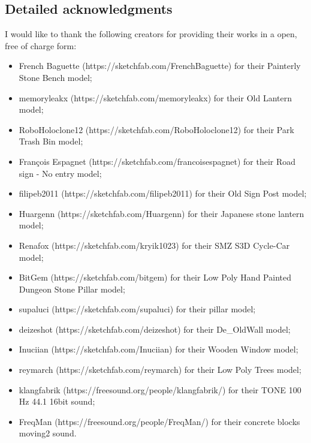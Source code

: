 \begin{appendices}

\chapter{Detailed acknowledgments}
\label{app:ack}
I would like to thank the following creators for providing their works in a open, free of charge form:
\begin{itemize}
	\item French Baguette (https://sketchfab.com/FrenchBaguette) for their Painterly Stone Bench model;
	\item memoryleakx (https://sketchfab.com/memoryleakx) for their Old Lantern model;
	\item RoboHoloclone12 (https://sketchfab.com/RoboHoloclone12) for their Park Trash Bin model;
	\item François Espagnet (https://sketchfab.com/francoisespagnet) for their Road sign - No entry model;
	\item filipeb2011 (https://sketchfab.com/filipeb2011) for their Old Sign Post model;
	\item Huargenn (https://sketchfab.com/Huargenn) for their Japanese stone lantern model;
	\item Renafox (https://sketchfab.com/kryik1023) for their SMZ S3D Cycle-Car model;
	\item BitGem (https://sketchfab.com/bitgem) for their Low Poly Hand Painted Dungeon Stone Pillar model;
	\item supaluci (https://sketchfab.com/supaluci) for their pillar model;
	\item deizeshot (https://sketchfab.com/deizeshot) for their De\_OldWall model;
	\item Inuciian (https://sketchfab.com/Inuciian) for their Wooden Window model;
	\item reymarch (https://sketchfab.com/reymarch) for their Low Poly Trees model;
	\item klangfabrik (https://freesound.org/people/klangfabrik/) for their TONE 100 Hz 44.1 16bit sound; %
	\item FreqMan (https://freesound.org/people/FreqMan/) for their concrete blocks moving2 sound. %
\end{itemize}


\end{appendices}
